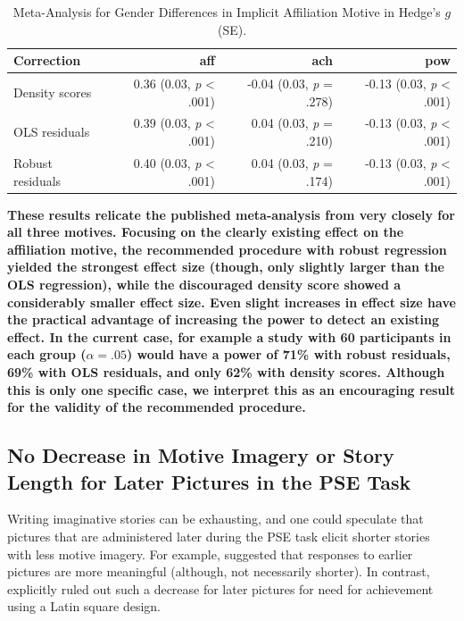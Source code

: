 \documentclass[man,a4paper,mask]{apa6}\usepackage[]{graphicx}\usepackage[]{color}
\newcommand{\added}[1]{\textcolor{colour_added}{\bf{#1}}}
\begin{document}
\begin{table}
		\caption{Meta-Analysis for Gender Differences in Implicit Affiliation Motive in Hedge's $g$ (SE).}
		\label{tab:MA}
		\footnotesize
		\begin{tabularx}{\textwidth}{lrrr}
		\toprule

Correction & aff & ach & pow \\ 
  \hline
Density scores & 0.36 (0.03, \emph{p} < .001) & -0.04 (0.03, \emph{p} = .278) & -0.13 (0.03, \emph{p} < .001) \\ 
  OLS residuals & 0.39 (0.03, \emph{p} < .001) & 0.04 (0.03, \emph{p} = .210) & -0.13 (0.03, \emph{p} < .001) \\ 
  Robust residuals & 0.40 (0.03, \emph{p} < .001) & 0.04 (0.03, \emph{p} = .174) & -0.13 (0.03, \emph{p} < .001) \\ 
   \hline

		\bottomrule
		\end{tabularx}
\end{table}



\added{These results relicate the published meta-analysis from \textcite{drescher_MetaanalyticEvidenceHigher_2016} very closely for all three motives. Focusing on the clearly existing effect on the affiliation motive, the recommended procedure with robust regression yielded the strongest effect size (though, only slightly larger than the OLS regression), while the discouraged density score showed a considerably smaller effect size. Even slight increases in effect size have the practical advantage of increasing the power to detect an existing effect. In the current case, for example a study with 60 participants in each group ($\alpha = .05$) would have a power of 71\% with robust residuals, 69\% with OLS residuals, and only 62\% with density scores. 
Although this is only one specific case, we interpret this as an encouraging result for the validity of the recommended procedure.}

\subsection{No Decrease in Motive Imagery or Story Length for Later Pictures in the PSE Task}
Writing imaginative stories can be exhausting, and one could speculate that pictures that are administered later during the PSE task elicit shorter stories with less motive imagery. For example, \textcite{smith_MethodologicalConsiderationsSteps_1992} suggested that responses to earlier pictures are more meaningful (although, not necessarily shorter). In contrast, \textcite[][Table 7.1]{mcclelland_achievement_1953} explicitly ruled out such a decrease for later pictures for need for achievement using a Latin square design.
\end{document}
